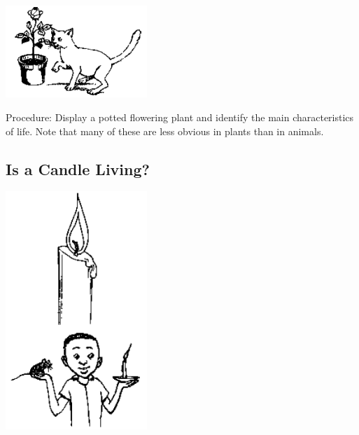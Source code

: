 \begin{multicols}{2}
\begin{center}
\includegraphics[width=0.4\textwidth]{./img/source/other-char-living.png}
\end{center}

\begin{description*}
\item[Procedure:]{Display a potted flowering plant and identify the main characteristics of life. Note that many
of these are less obvious in plants than in animals.}
\end{description*}

\subsection{Is a Candle Living?} %

\begin{center}
\includegraphics[width=0.4\textwidth]{./img/source/candle-living.png}
\end{center}


\end{multicols}
